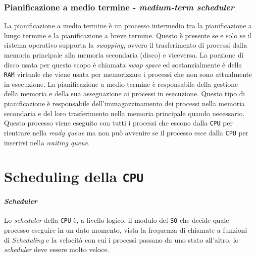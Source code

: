     \subsubsection{Pianificazione a medio termine - \textit{medium-term scheduler}}
        La pianificazione a medio termine è un processo intermedio tra la pianificazione a lungo termine e la pianificazione a breve termine. Questo è presente se e solo se il sistema operativo supporta la \textit{swapping}, ovvero il trasferimento di processi dalla memoria principale alla memoria secondaria (disco) e viceversa. La porzione di disco usata per questo scopo è chiamata \textit{swap space} ed sostanzialmente è della \texttt{RAM} virtuale che viene usata per memorizzare i processi che non sono attualmente in esecuzione. La pianificazione a medio termine è responsabile della gestione della memoria e della sua assegnazione ai processi in esecuzione. Questo tipo di pianificazione è responsabile dell'immagazzinamento dei processi nella memoria secondaria e del loro trasferimento nella memoria principale quando necessario. Questo processo viene eseguito con tutti i processi che escono dalla \texttt{CPU} per rientrare nella \textit{ready queue} ma non può avvenire se il processo esce dalla \texttt{CPU} per inserirsi nella \textit{waiting queue}.


\section{Scheduling della \texttt{CPU}}
    \paragraph{\textit{Scheduler}}Lo \textit{scheduler} della \texttt{CPU} è, a livello logico, il modulo del \texttt{SO} che decide quale processo eseguire in un dato momento, vista la frequenza di chiamate a funzioni di \textit{Scheduling} e la velocità con cui i processi passano da uno stato all'altro, lo \textit{scheduler} deve essere molto veloce.

